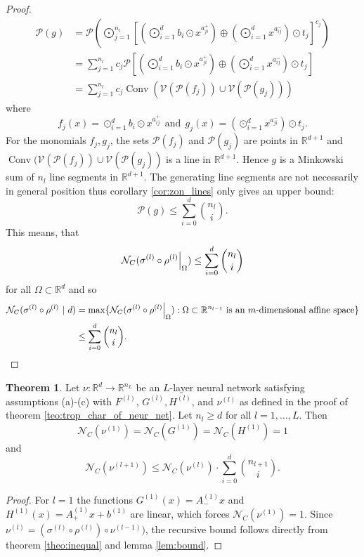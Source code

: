 \documentclass{article}
\theoremstyle{definition}
\newtheorem{theorem}{Theorem}[section]
\DeclareMathOperator{\Conv}{Conv}
\newcommand\restr[2]{{%
  \left.\kern-\nulldelimiterspace %
  #1 %
  \right|_{#2} %
  }}
\begin{document}
\begin{proof}
\begin{align*}
\mathcal{P}(g) &= \mathcal{P}\left(\displaystyle\bigodot_{j=1}^{n_l}\left[\left(\displaystyle\bigodot^{d}_{i=1}b_i \odot x^{a^{+}_{ji}}\right) \oplus \left( \displaystyle\bigodot_{i=1}^{d} x^{a_{ij}^{-}} \right) \odot t_j\right]^{c_j}\right) \\
&= \displaystyle\sum_{j=1}^{n_l}c_j \mathcal{P}\left[\left(\displaystyle\bigodot^{d}_{i=1}b_i \odot x^{a^{+}_{ji}}\right) \oplus \left( \displaystyle\bigodot_{i=1}^{d} x^{a_{ij}^{-}} \right) \odot t_j\right] \\
&= \displaystyle\sum_{j=1}^{n_l}c_j \Conv(\mathcal{V}(\mathcal{P}(f_j)) \cup \mathcal{V}(\mathcal{P}(g_j)))
\end{align*}
where
$$f_j(x)=\displaystyle\odot^{d}_{i=1}b_i \odot x^{a_{ij}^{+}} \ \ \text{and} \ \ g_j(x)= \left( \displaystyle\odot^{d}_{i=1} x^{a_{ji}^{-}} \right) \odot t_j.$$
For the monomials $f_j, g_j$, the sets $\mathcal{P}(f_j)$ and $\mathcal{P}(g_j)$ are points in $\mathbb{R}^{d+1}$ and $\Conv(\mathcal{V}(\mathcal{P}(f_j)) \cup \mathcal{V}(\mathcal{P}(g_j))$ is a line in $\mathbb{R}^{d+1}$. Hence $g$ is a Minkowski sum of $n_l$ line segments in $\mathbb{R}^{d+1}$. The generating line segments are not necessarily in general position thus corollary \ref{cor:zon_lines} only gives an upper bound:
$$\mathcal{P}(g) \leq \displaystyle\sum^{d}_{i=0} \binom{n_l}{i}.$$
This means, that
$$\mathcal{N}_{C}(\restr{\sigma^{(l)} \circ \rho^{(l)}}{\Omega}) \leq \displaystyle\sum^{d}_{i=0} \binom{n_l}{i}$$
for all $\Omega \subset \mathbb{R}^{d}$ and so
\begin{align*}
\mathcal{N}_{C}(\sigma^{(l)} \circ \rho^{(l)} \ | \ d) 
&= \max\{\mathcal{N}_C(\restr{\sigma^{(l)} \circ \rho^{(l)}}{\Omega}):\Omega \subset \mathbb{R}^{n_{l-1}} \ \text{is an} \ m \text{-dimensional affine space}\} \\
&\leq \displaystyle\sum^{d}_{i=0} \binom{n_l}{i}.
\end{align*}
\end{proof}

\begin{theorem}\hspace{1sp}\cite{zhang2018tropical}\label{theo:end_theo_proof}
Let $\nu : \mathbb{R}^{d} \to \mathbb{R}^{n_L}$ be an $L$-layer neural network satisfying assumptions (a)-(c) with $F^{(l)}$, $G^{(l)}, H^{(l)}$, and $\nu^{(l)}$ as defined in the proof of theorem \ref{teo:trop_char_of_neur_net}. Let $n_l \geq d$ for all $l= 1, \dots , L$. Then
$$\mathcal{N}_C(\nu^{(1)}) = \mathcal{N}_C(G^{(1)}) = \mathcal{N}_C(H^{(1)}) = 1$$
and
$$\mathcal{N}_C(\nu^{(l+1)}) \leq \mathcal{N}_C(\nu^{(l)}) \cdot \displaystyle\sum_{i=0}^{d}\binom{n_{l+1}}{i}.$$
\end{theorem}
\begin{proof}
For $l=1$ the functions $G^{(1)}(x) = A^{(1)}_{-}x$ and $H^{(1)}(x)=A^{(1)}_{+}x + b^{(1)}$ are linear, which forces $\mathcal{N}_{C}(\nu^{(1)})=1$. Since $\nu^{(l)}=(\sigma^{(l)} \circ \rho^{(l)}) \circ \nu^{(l-1)})$, the recursive bound follows directly from theorem \ref{theo:inequal} and lemma \ref{lem:bound}.
\end{proof}
\end{document}
